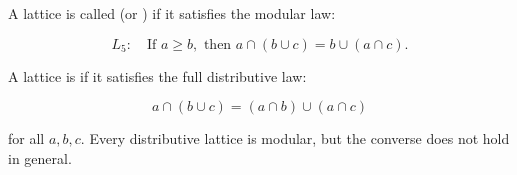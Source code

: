 A lattice is called  (or ) if it satisfies the modular law:

$$L_5: \quad \text{If } a \geq b, \text{ then } a \cap (b \cup c) = b \cup (a \cap c).$$

A lattice is  if it satisfies the full distributive law:

$$a \cap (b \cup c) = (a \cap b) \cup (a \cap c)$$

for all $a, b, c$. Every distributive lattice is modular, but the converse does not hold in general.
